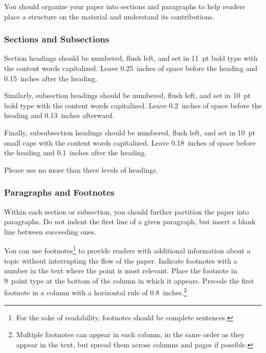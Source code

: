 \documentclass{article}
\begin{document}
You should organize your paper into sections and paragraphs to help
readers place a structure on the material and understand its
contributions.

\subsubsection{Sections and Subsections}

Section headings should be numbered, flush left, and set in 11~pt bold
type with the content words capitalized. Leave 0.25~inches of space
before the heading and 0.15~inches after the heading.

Similarly, subsection headings should be numbered, flush left, and set
in 10~pt bold type with the content words capitalized. Leave
0.2~inches of space before the heading and 0.13~inches afterward.

Finally, subsubsection headings should be numbered, flush left, and
set in 10~pt small caps with the content words capitalized. Leave
0.18~inches of space before the heading and 0.1~inches after the
heading.

Please use no more than three levels of headings.

\subsubsection{Paragraphs and Footnotes}

Within each section or subsection, you should further partition the
paper into paragraphs. Do not indent the first line of a given
paragraph, but insert a blank line between succeeding ones.

You can use footnotes\footnote{For the sake of readability, footnotes
should be complete sentences.} to provide readers with additional
information about a topic without interrupting the flow of the paper.
Indicate footnotes with a number in the text where the point is most
relevant. Place the footnote in 9~point type at the bottom of the
column in which it appears. Precede the first footnote in a column
with a horizontal rule of 0.8~inches.\footnote{Multiple footnotes can
appear in each column, in the same order as they appear in the text,
but spread them across columns and pages if possible.}
\end{document}
